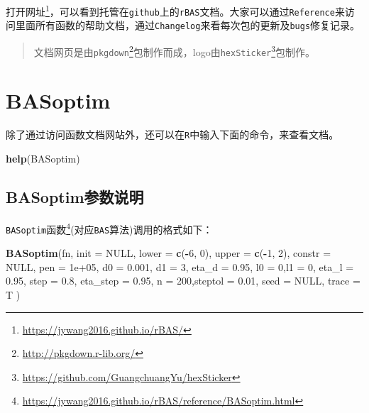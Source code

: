 \documentclass[]{ctexbook}
\newenvironment{Shaded}{\begin{snugshade}}{\end{snugshade}}
\newcommand{\KeywordTok}[1]{\textcolor[rgb]{0.13,0.29,0.53}{\textbf{#1}}}
\newcommand{\DataTypeTok}[1]{\textcolor[rgb]{0.13,0.29,0.53}{#1}}
\newcommand{\DecValTok}[1]{\textcolor[rgb]{0.00,0.00,0.81}{#1}}
\newcommand{\FloatTok}[1]{\textcolor[rgb]{0.00,0.00,0.81}{#1}}
\newcommand{\OtherTok}[1]{\textcolor[rgb]{0.56,0.35,0.01}{#1}}
\newcommand{\OperatorTok}[1]{\textcolor[rgb]{0.81,0.36,0.00}{\textbf{#1}}}
\newcommand{\NormalTok}[1]{#1}
\renewcommand{\href}[2]{#2\footnote{\url{#1}}}
\theoremstyle{definition}
\theoremstyle{definition}
\theoremstyle{definition}
\theoremstyle{remark}
\begin{document}
打开\href{https://jywang2016.github.io/rBAS/}{网址}，可以看到托管在\texttt{github}上的\texttt{rBAS}文档。大家可以通过\texttt{Reference}来访问里面所有函数的帮助文档，通过\texttt{Changelog}来看每次包的更新及\texttt{bugs}修复记录。

\begin{quote}
文档网页是由\href{http://pkgdown.r-lib.org/}{\texttt{pkgdown}}包制作而成，logo由\href{https://github.com/GuangchuangYu/hexSticker}{\texttt{hexSticker}}包制作。
\end{quote}

\section{BASoptim}\label{basoptim}

除了通过访问函数文档网站外，还可以在\texttt{R}中输入下面的命令，来查看文档。

\begin{Shaded}
\begin{Highlighting}[]
\KeywordTok{help}\NormalTok{(BASoptim)}
\end{Highlighting}
\end{Shaded}

\subsection{BASoptim参数说明}\label{BASparms}

\href{https://jywang2016.github.io/rBAS/reference/BASoptim.html}{\texttt{BASoptim}函数}(对应\texttt{BAS}算法)调用的格式如下：

\begin{Shaded}
\begin{Highlighting}[]
\KeywordTok{BASoptim}\NormalTok{(fn, }
         \DataTypeTok{init =} \OtherTok{NULL}\NormalTok{, }
         \DataTypeTok{lower =} \KeywordTok{c}\NormalTok{(}\OperatorTok{-}\DecValTok{6}\NormalTok{, }\DecValTok{0}\NormalTok{), }\DataTypeTok{upper =} \KeywordTok{c}\NormalTok{(}\OperatorTok{-}\DecValTok{1}\NormalTok{, }\DecValTok{2}\NormalTok{),}
         \DataTypeTok{constr =} \OtherTok{NULL}\NormalTok{, }\DataTypeTok{pen =} \FloatTok{1e+05}\NormalTok{,}
         \DataTypeTok{d0 =} \FloatTok{0.001}\NormalTok{, }\DataTypeTok{d1 =} \DecValTok{3}\NormalTok{, }\DataTypeTok{eta_d =} \FloatTok{0.95}\NormalTok{, }
         \DataTypeTok{l0 =} \DecValTok{0}\NormalTok{,}\DataTypeTok{l1 =} \DecValTok{0}\NormalTok{, }\DataTypeTok{eta_l =} \FloatTok{0.95}\NormalTok{, }
         \DataTypeTok{step =} \FloatTok{0.8}\NormalTok{, }\DataTypeTok{eta_step =} \FloatTok{0.95}\NormalTok{, }
         \DataTypeTok{n =} \DecValTok{200}\NormalTok{,}\DataTypeTok{steptol =} \FloatTok{0.01}\NormalTok{, }
         \DataTypeTok{seed =} \OtherTok{NULL}\NormalTok{, }\DataTypeTok{trace =}\NormalTok{ T )}
\end{Highlighting}
\end{Shaded}
\end{document}
